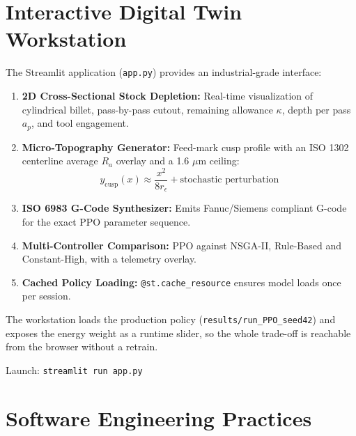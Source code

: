 \documentclass[11pt,a4paper]{article}
\newcommand{\Ra}{R_a}
\begin{document}
\section{Interactive Digital Twin Workstation}

The Streamlit application (\texttt{app.py}) provides an industrial-grade interface:

\begin{enumerate}
    \item \textbf{2D Cross-Sectional Stock Depletion:} Real-time visualization of cylindrical billet, pass-by-pass cutout, remaining allowance $\kappa$, depth per pass $a_p$, and tool engagement.
    \item \textbf{Micro-Topography Generator:} Feed-mark cusp profile with an ISO 1302 centerline average $\Ra$ overlay and a 1.6 $\mu$m ceiling:
    \[
        y_\text{cusp}(x) \approx \frac{x^2}{8 r_\epsilon} + \text{stochastic perturbation}
    \]
    \item \textbf{ISO 6983 G-Code Synthesizer:} Emits Fanuc/Siemens compliant G-code for the exact PPO parameter sequence.
    \item \textbf{Multi-Controller Comparison:} PPO against NSGA-II, Rule-Based and Constant-High, with a telemetry overlay.
    \item \textbf{Cached Policy Loading:} \texttt{@st.cache\_resource} ensures model loads once per session.
\end{enumerate}

The workstation loads the production policy (\texttt{results/run\_PPO\_seed42}) and exposes the energy weight as a runtime slider, so the whole trade-off is reachable from the browser without a retrain.

Launch: \texttt{streamlit run app.py}

\section{Software Engineering Practices}
\end{document}
